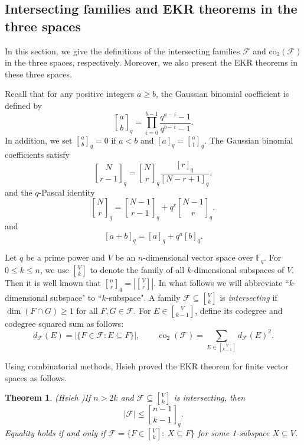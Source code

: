 \documentclass[11pt]{article}
\newtheorem{theorem}{Theorem}
\theoremstyle{definition}
\newcommand{\Fq}{\mathbb F_q}
\newcommand{\Gr}[2]{\genfrac{[}{]}{0pt}{}{#1}{#2}}
\newcommand{\qbinom}[2]{\genfrac{[}{]}{0pt}{}{#1}{#2}_q}
\newcommand{\qnum}[1]{[#1]_q}
\newcommand{\co}{\operatorname{co}_2}
\begin{document}
\subsection{Intersecting families and EKR theorems in the three  spaces}
In this section, we give the definitions of the intersecting families $\mathcal{F}$ and $\mathrm{co}_2(\mathcal{F})$ in the three spaces, respectively. Moreover, we also present the  EKR theorems in these three spaces.

\vskip 2mm
Recall that for any positive integers $a\geq b$, the Gaussian binomial coefficient is defined by
\[
 \qbinom{a}{b}=\prod\limits_{i=0}^{b-1}\frac{q^{a-i}-1}{q^{b-i}-1}.
\]
In addition, we set $\qbinom{a}{b}=0$ if $a<b$ and $\qnum{a}=\qbinom{a}{1}$.
The Gaussian binomial coefficients satisfy
\begin{equation}\label{eq:qbinom-ratio}
 \qbinom{N}{r-1}=\qbinom{N}{r}\frac{\qnum r}{\qnum{N-r+1}},
\end{equation}
and the $q$-Pascal identity
\begin{equation}\label{eq:q-pascal}
 \qbinom{N}{r}=\qbinom{N-1}{r-1}+q^r\qbinom{N-1}{r},
\end{equation}
and
\begin{equation}\label{eq:qinteger-sum}
[a+b]_q=[a]_q+q^a[b]_q.
\end{equation}

\vskip 2mm
\vskip 2mm

Let $q$ be a prime power and $V$ be an $n$-dimensional vector space over $\Fq$. For $0\le k\le n$, we use $\Gr{V}{k}$ to denote the family of all $k$-dimensional subspaces of $V$. Then it is well known that $\qbinom{n}{r}=|\Gr{V}{r}|$. In what follows we will abbreviate ``$k$-dimensional subspace" to ``$k$-subspace".  
A family $\mathcal F\subseteq \Gr{V}{k}$ is \emph{intersecting} if
$\dim(F\cap G)\ge 1$ for all $F,G\in\mathcal F$. For $E\in\Gr{V}{k-1}$, define its codegree and codegree squared sum as follows:
\[
d_{\mathcal F}(E)=|\{F\in\mathcal F:E\subseteq F\}|,
\qquad
\co(\mathcal F)=\sum_{E\in\Gr{V}{k-1}}d_{\mathcal F}(E)^2.
\]

Using combinatorial methods, Hsieh \cite{Hsieh1975} proved the EKR theorem for finite vector spaces as follows.

\begin{theorem}(Hsieh \cite{Hsieh1975})\label{thm:Hsieh}
If $n>2k$ and $\mathcal F\subseteq \Gr{V}{k}$ is intersecting, then
\[
 |\mathcal F|\le \qbinom{n-1}{k-1}.
\]
Equality holds if and only if  $\mathcal F=\{F\in \Gr{V}{k}:\ X\subseteq F\}$ for some 1-subspace $X\subseteq V$.
\end{theorem}
\end{document}
